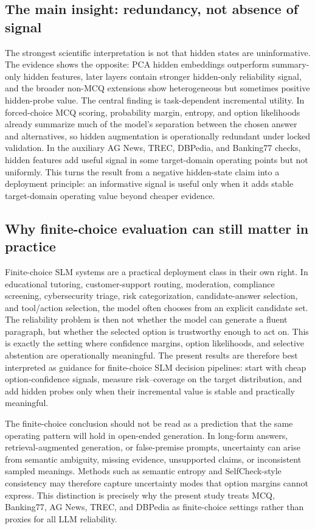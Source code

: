 \documentclass[preprint,12pt,authoryear]{elsarticle}
\begin{document}
\subsection{The main insight: redundancy, not absence of signal}
The strongest scientific interpretation is not that hidden states are uninformative. The evidence shows the opposite: PCA hidden embeddings outperform summary-only hidden features, later layers contain stronger hidden-only reliability signal, and the broader non-MCQ extensions show heterogeneous but sometimes positive hidden-probe value. The central finding is task-dependent incremental utility. In forced-choice MCQ scoring, probability margin, entropy, and option likelihoods already summarize much of the model's separation between the chosen answer and alternatives, so hidden augmentation is operationally redundant under locked validation. In the auxiliary AG News, TREC, DBPedia, and Banking77 checks, hidden features add useful signal in some target-domain operating points but not uniformly. This turns the result from a negative hidden-state claim into a deployment principle: an informative signal is useful only when it adds stable target-domain operating value beyond cheaper evidence.

\subsection{Why finite-choice evaluation can still matter in practice}
Finite-choice SLM systems are a practical deployment class in their own right. In educational tutoring, customer-support routing, moderation, compliance screening, cybersecurity triage, risk categorization, candidate-answer selection, and tool/action selection, the model often chooses from an explicit candidate set. The reliability problem is then not whether the model can generate a fluent paragraph, but whether the selected option is trustworthy enough to act on. This is exactly the setting where confidence margins, option likelihoods, and selective abstention are operationally meaningful. The present results are therefore best interpreted as guidance for finite-choice SLM decision pipelines: start with cheap option-confidence signals, measure risk--coverage on the target distribution, and add hidden probes only when their incremental value is stable and practically meaningful.

The finite-choice conclusion should not be read as a prediction that the same operating pattern will hold in open-ended generation. In long-form answers, retrieval-augmented generation, or false-premise prompts, uncertainty can arise from semantic ambiguity, missing evidence, unsupported claims, or inconsistent sampled meanings. Methods such as semantic entropy and SelfCheck-style consistency may therefore capture uncertainty modes that option margins cannot express. This distinction is precisely why the present study treats MCQ, Banking77, AG News, TREC, and DBPedia as finite-choice settings rather than proxies for all LLM reliability.
\end{document}
